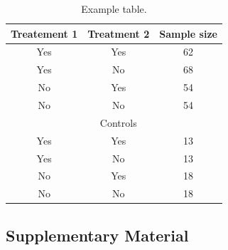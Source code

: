 \documentclass[letterpaper, 12pt]{article}
\begin{document}
\pagebreak
\begin{table}[H]
    \centering
	\caption{Example table.}
	\label{table:simpleExample}
	\begin{tabular}{ccc} %
    \hline
	Treatement 1 & Treatment 2 & Sample size \\
    \hline
	 Yes & Yes & 62\\
	 Yes & No & 68\\
	 No & Yes & 54\\
	 No & No & 54\\
	 \hline
    & Controls & \\
    \hline
     Yes & Yes & 13\\
	 Yes & No & 13\\
	 No & Yes & 18\\
	 No & No & 18\\
	\hline
	\end{tabular}
\end{table}




\pagebreak
\subsection*{Supplementary Material}
\setcounter{table}{0} \renewcommand{\thetable}{S\arabic{table}}
\setcounter{figure}{0} \renewcommand{\thefigure}{S\arabic{figure}}
\end{document}
